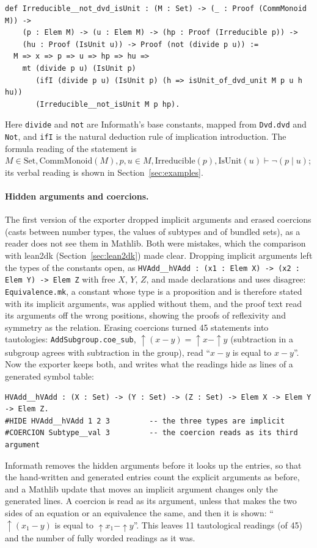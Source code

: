 \documentclass{easychair}
\newcommand{\ttt}[1]{\texttt{#1}}
\begin{document}
\begin{lstlisting}
def Irreducible__not_dvd_isUnit : (M : Set) -> (_ : Proof (CommMonoid M)) ->
    (p : Elem M) -> (u : Elem M) -> (hp : Proof (Irreducible p)) ->
    (hu : Proof (IsUnit u)) -> Proof (not (divide p u)) :=
  M => x => p => u => hp => hu =>
    mt (divide p u) (IsUnit p)
       (ifI (divide p u) (IsUnit p) (h => isUnit_of_dvd_unit M p u h hu))
       (Irreducible__not_isUnit M p hp).
\end{lstlisting}
Here \ttt{divide} and \ttt{not} are Informath's base constants, mapped from \ttt{Dvd.dvd} and
\ttt{Not}, and \ttt{ifI} is the natural deduction rule of implication introduction.
The formula reading of the statement is
$M \in \mathrm{Set}, \mathrm{CommMonoid}(M), p, u \in M, \mathrm{Irreducible}(p),
\mathrm{IsUnit}(u) \vdash \neg (p \mid u)$; its verbal reading is shown in
Section~\ref{sec:examples}.

\paragraph{Hidden arguments and coercions.} The first version of the exporter dropped implicit
arguments and erased coercions (casts between number types, the values of subtypes and of
bundled sets), as a reader does not see them in Mathlib. Both were mistakes, which the
comparison with lean2dk (Section~\ref{sec:lean2dk}) made clear. Dropping implicit arguments left
the types of the constants open, as \ttt{HVAdd\_\_hVAdd : (x1 : Elem X) -> (x2 : Elem Y) ->
Elem Z} with free $X$, $Y$, $Z$, and made declarations and uses disagree: \ttt{Equivalence.mk},
a constant whose type is a proposition and is therefore stated with its implicit arguments, was
applied without them, and the proof text read its arguments off the wrong positions, showing the
proofs of reflexivity and symmetry as the relation. Erasing coercions turned 45 statements into
tautologies: \ttt{AddSubgroup.coe\_sub}, $\uparrow(x - y) = \uparrow x - \uparrow y$ (subtraction
in a subgroup agrees with subtraction in the group), read ``$x - y$ is equal to $x - y$''.
Now the exporter keeps both, and writes what the readings hide as lines of a generated symbol
table:
\begin{lstlisting}
HVAdd__hVAdd : (X : Set) -> (Y : Set) -> (Z : Set) -> Elem X -> Elem Y -> Elem Z.
#HIDE HVAdd__hVAdd 1 2 3         -- the three types are implicit
#COERCION Subtype__val 3         -- the coercion reads as its third argument
\end{lstlisting}
Informath removes the hidden arguments before it looks up the entries, so that the hand-written
and generated entries count the explicit arguments as before, and a Mathlib update that moves an
implicit argument changes only the generated lines. A coercion is read as its argument, unless
that makes the two sides of an equation or an equivalence the same, and then it is shown:
``$\uparrow(x_1 - y)$ is equal to $\uparrow x_1 - \uparrow y$''. This leaves 11 tautological
readings (of 45) and the number of fully worded readings as it was.
\end{document}

